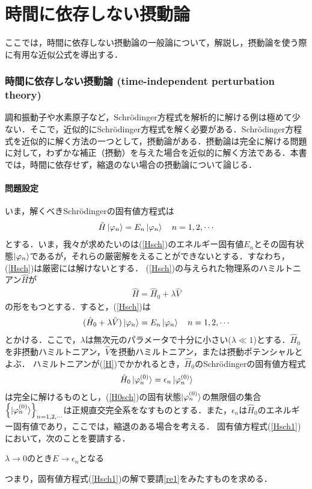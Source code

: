 \part{時間に依存しない摂動論}
ここでは，時間に依存しない摂動論の一般論について，解説し，摂動論を使う際に有用な近似公式を導出する．
\section{時間に依存しない摂動論 (time-independent perturbation theory)}
調和振動子や水素原子など，Schr\"{o}dinger方程式を解析的に解ける例は極めて少ない．そこで，近似的にSchr\"{o}dinger方程式を解く必要がある．Schr\"{o}dinger方程式を近似的に解く方法の一つとして，摂動論がある．摂動論は完全に解ける問題に対して，わずかな補正（摂動）を与えた場合を近似的に解く方法である．本書では，時間に依存せず，縮退のない場合の摂動論について論じる．
\subsection{問題設定}
いま，解くべきSchr\"{o}dingerの固有値方程式は
\begin{align}\label{Hsch}
\hat{H}\ket{\varphi_n}=E_n\ket{\varphi_n}\ \ \ n=1,2,\cdots
\end{align}
とする．いま，我々が求めたいのは(\ref{Hsch})のエネルギー固有値$E_n$とその固有状態$\ket{\varphi_n}$であるが，それらの厳密解をえることができないとする．すなわち，(\ref{Hsch})は厳密には解けないとする．
(\ref{Hsch})の与えられた物理系のハミルトニアン$\hat{H}$が
\begin{align}\label{H}
\hat{H}=\hat{H}_0+\lambda\hat{V}
\end{align}
の形をもつとする．すると，(\ref{Hsch})は
\begin{align}\label{Hsch1}
(\hat{H}_0+\lambda\hat{V})\ket{\varphi_n}=E_n\ket{\varphi_n}\ \ \ n=1,2,\cdots
\end{align}
とかける．ここで，$\lambda$は無次元のパラメータで十分に小さい($\lambda\ll1$)とする．$\hat{H}_0$を非摂動ハミルトニアン，$\hat{V}$を摂動ハミルトニアン，または摂動ポテンシャルとよぶ．
ハミルトニアンが(\ref{H})でかかれるとき，$\hat{H}_0$のSchr\"{o}dingerの固有値方程式
\begin{align}\label{H0sch}
\hat{H}_0\ket{\varphi^{(0)}_n}=\epsilon_n\ket{\varphi^{(0)}_n}
\end{align}
は完全に解けるものとし，(\ref{H0sch})の固有状態$\ket{\varphi^{(0)}_n}$の無限個の集合$\left\{\ket{\varphi^{(0)}_n}\right\}_{n=1,2,\cdots}$は正規直交完全系をなすものとする．また，$\epsilon_n$は$\hat{H}_0$のエネルギー固有値であり，ここでは，縮退のある場合を考える．
固有値方程式(\ref{Hsch1})において，次のことを要請する．
　\begin{request}\label{re1}
$\lambda\to0$のとき$E\to\epsilon_n$となる
\end{request}
つまり，固有値方程式(\ref{Hsch1})の解で要請\ref{re1}をみたすものを求める．











